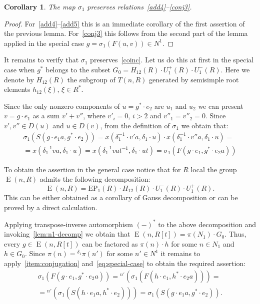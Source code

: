 \documentclass[oneside, 10pt]{amsart}
\DeclareMathOperator{\E}{E}
\numberwithin{equation}{section}
\numberwithin{lemma}{section}
\newtheorem{cor}[lemma]{Corollary}
\theoremstyle{definition}
\theoremstyle{remark}
\begin{document}
\begin{cor}
 The map $\sigma_1$ preserves relations~\eqref{add4}--\eqref{conj3}.
\end{cor}
\begin{proof}
 For~\eqref{add4}--\eqref{add5} this is an immediate corollary of the first assertion of the previous lemma.
 For~\eqref{conj3} this follows from the second part of the lemma applied in the special case $g = \sigma_1(F(u, v)) \in N^1$.
\end{proof}

It remains to verify that $\sigma_1$ preserves~\eqref{coinc}.
Let us do this at first in the special case when $g^*$ belongs to the subset $G_0 = H_{12}(R) \cdot U^+_1(R) \cdot U^-_1(R)$.
Here we denote by $H_{12}(R)$ the subgroup of $T(n, R)$ generated by semisimple root elements $ h_{12}(\xi)$, $\xi \in R^*$.

Since the only nonzero components of $u = g^* \cdot e_2$ are $u_1$ and $u_2$ we can present $v = g \cdot e_1$ as a sum $v' + v''$, where 
 $v'_i=0$, $i>2$ and $v''_1=v''_2=0$.
Since $v', v'' \in D(u)$ and $u \in D(v)$, from the definition of $\sigma_1$ we obtain that:
\begin{multline} \label{eq:special-case}
 \sigma_1(S(g \cdot e_1a, g^* \cdot e_2)) = x(\delta_1^{-1} \cdot v'a, \delta_1\cdot  u) \cdot x(\delta_1^{-1}\cdot v''a, \delta_1 \cdot u) = \\
  = x(\delta_1^{-1} va, \delta_1 \cdot u) = x(\delta_1^{-1} vat^{-1}, \delta_1 \cdot ut) = \sigma_1(F(g \cdot e_1, g^* \cdot e_2a)) 
\end{multline}

To obtain the assertion in the general case notice that for $R$ local the group $\E(n, R)$ admits the following decomposition:
\[\E(n, R) = \mathrm{EP}_1(R) \cdot H_{12}(R) \cdot U^-_1(R) \cdot U^+_1(R).\]
This can be either obtained as a corollary of Gauss decomposition or can be proved by a direct calculation. %

Applying transpose-inverse automorphism $(-)^*$ to the above decomposition and invoking~\cref{lem:n1-decomp} we obtain that $\E(n, R[t]) = \pi(N_1) \cdot G_0$.
Thus, every $g \in \E(n, R[t])$ can be factored as $\pi(n) \cdot h$ for some $n\in N_1$ and $h \in G_0$.
Since $\pi(n) = {}^{\delta_1} \pi(n')$ for some $n' \in N^1$ it remains to apply~\cref{item:conjugation} and~\eqref{eq:special-case} to obtain the required assertion:
\begin{multline} \nonumber \sigma_1(F(g \cdot e_1, g^* \cdot e_2a)) = {}^{n'}(\sigma_1(F(h \cdot e_1, h^* \cdot e_2a))) = \\
                           = {}^{n'}(\sigma_1(S(h \cdot e_1a, h^* \cdot e_2))) = \sigma_1(S(g \cdot e_1a, g^* \cdot e_2)). \end{multline}
\end{document}
